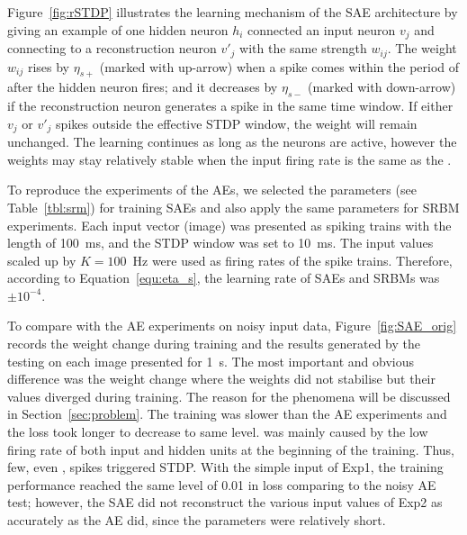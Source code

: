 Figure~\ref{fig:rSTDP} illustrates the learning mechanism of the SAE architecture by giving an example of one hidden neuron $h_i$ connected \DIFdelbegin {}\DIFdelend \DIFaddbegin {}\DIFaddend an input neuron $v_j$ and connecting to a reconstruction neuron $v'_j$ with the same strength $w_{ij}$.
The weight $w_{ij}$ rises by $\eta_{s+}$ (marked with \DIFaddbegin {}\DIFaddend up-arrow) when a spike comes within the period of \DIFdelbegin {}\DIFdelend \DIFaddbegin {}\DIFaddend after the hidden neuron fires;
and it decreases by $\eta_{s-}$ (marked with \DIFaddbegin {}\DIFaddend down-arrow) if the reconstruction neuron generates a spike in the same time window.
If either $v_j$ or $v'_j$ spikes outside the effective STDP window, the weight will remain unchanged.
The learning continues as long as the neurons are active, however the weights may stay relatively stable when the input firing rate is the same as the \DIFdelbegin {}\DIFdelend \DIFaddbegin {}\DIFaddend .

To reproduce the experiments of the AEs, we selected the parameters (see Table~\ref{tbl:srm}) for training SAEs and also apply the same parameters for SRBM experiments.
Each input vector (image) was presented as spiking trains with the length of 100~ms, and the STDP window was set to 10~ms.
The input values scaled up by $K=100$~Hz were used as firing rates of the spike trains.
Therefore, according to Equation~\ref{equ:eta_s}, the learning rate of SAEs and SRBMs was $\pm 10^{-4}$.

To compare with the AE experiments on noisy input data, Figure~\ref{fig:SAE_orig} records the weight change during training and the results generated by the testing on each image presented for 1~s.
The most important and obvious difference was the weight change where the weights did not stabilise but their values diverged during training.
The reason for the phenomena will be discussed in Section~\ref{sec:problem}.
The training was slower than the AE experiments and the loss took longer \DIFdelbegin {}\DIFdelend to decrease to \DIFdelbegin {}\DIFdelend \DIFaddbegin {}\DIFaddend same level.
\DIFdelbegin {}\DIFdelend \DIFaddbegin {}\DIFaddend was mainly caused by the low firing rate of both input and hidden units at the beginning of the training.
Thus, few, even \DIFdelbegin {}\DIFdelend \DIFaddbegin {}\DIFaddend , spikes triggered STDP.
With the simple input of Exp1, the training performance reached the same level of 0.01 in loss comparing to the noisy AE test;
however, the SAE did not reconstruct the various input values of Exp2 as accurately as the AE did, since the parameters \DIFdelbegin {}\DIFdelend \DIFaddbegin {}\DIFaddend were relatively short.

